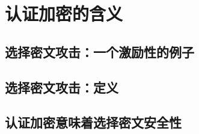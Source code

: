 \section{认证加密的含义}\label{sec:9-2}

\subsection{选择密文攻击：一个激励性的例子}\label{subsec:9-2-1}

\subsection{选择密文攻击：定义}\label{subsec:9-2-2}

\subsection{认证加密意味着选择密文安全性}\label{subsec:9-2-3}